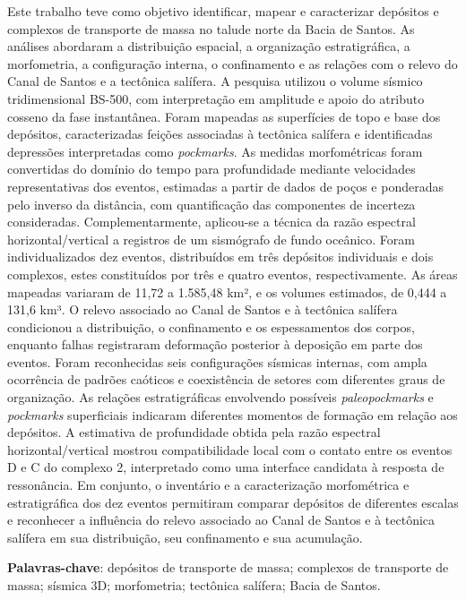 \begin{resumo}
\SingleSpacing\setlength{\parindent}{0pt}
Este trabalho teve como objetivo identificar, mapear e caracterizar depósitos e complexos de transporte de massa no talude norte da Bacia de Santos. As análises abordaram a distribuição espacial, a organização estratigráfica, a morfometria, a configuração interna, o confinamento e as relações com o relevo do Canal de Santos e a tectônica salífera. A pesquisa utilizou o volume sísmico tridimensional BS-500, com interpretação em amplitude e apoio do atributo cosseno da fase instantânea. Foram mapeadas as superfícies de topo e base dos depósitos, caracterizadas feições associadas à tectônica salífera e identificadas depressões interpretadas como \textit{pockmarks}. As medidas morfométricas foram convertidas do domínio do tempo para profundidade mediante velocidades representativas dos eventos, estimadas a partir de dados de poços e ponderadas pelo inverso da distância, com quantificação das componentes de incerteza consideradas. Complementarmente, aplicou-se a técnica da razão espectral horizontal/vertical a registros de um sismógrafo de fundo oceânico. Foram individualizados dez eventos, distribuídos em três depósitos individuais e dois complexos, estes constituídos por três e quatro eventos, respectivamente. As áreas mapeadas variaram de 11,72 a 1.585,48 km², e os volumes estimados, de 0,444 a 131,6 km³. O relevo associado ao Canal de Santos e à tectônica salífera condicionou a distribuição, o confinamento e os espessamentos dos corpos, enquanto falhas registraram deformação posterior à deposição em parte dos eventos. Foram reconhecidas seis configurações sísmicas internas, com ampla ocorrência de padrões caóticos e coexistência de setores com diferentes graus de organização. As relações estratigráficas envolvendo possíveis \textit{paleopockmarks} e \textit{pockmarks} superficiais indicaram diferentes momentos de formação em relação aos depósitos. A estimativa de profundidade obtida pela razão espectral horizontal/vertical mostrou compatibilidade local com o contato entre os eventos D e C do complexo 2, interpretado como uma interface candidata à resposta de ressonância. Em conjunto, o inventário e a caracterização morfométrica e estratigráfica dos dez eventos permitiram comparar depósitos de diferentes escalas e reconhecer a influência do relevo associado ao Canal de Santos e à tectônica salífera em sua distribuição, seu confinamento e sua acumulação.

\vspace{\onelineskip}
\noindent\textbf{Palavras-chave}: depósitos de transporte de massa; complexos de transporte de massa; sísmica 3D; morfometria; tectônica salífera; Bacia de Santos.
\end{resumo}
